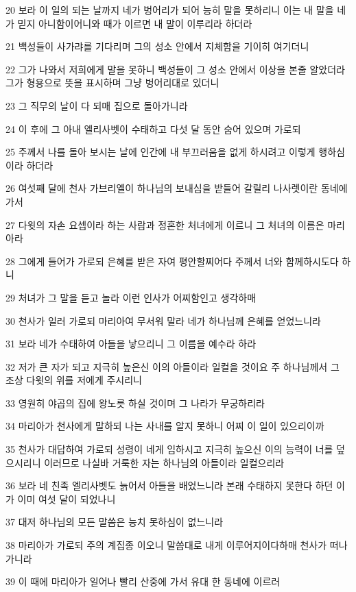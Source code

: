 \par 20 보라 이 일의 되는 날까지 네가 벙어리가 되어 능히 말을 못하리니 이는 내 말을 네가 믿지 아니함이어니와 때가 이르면 내 말이 이루리라 하더라
\par 21 백성들이 사가랴를 기다리며 그의 성소 안에서 지체함을 기이히 여기더니
\par 22 그가 나와서 저희에게 말을 못하니 백성들이 그 성소 안에서 이상을 본줄 알았더라 그가 형용으로 뜻을 표시하며 그냥 벙어리대로 있더니
\par 23 그 직무의 날이 다 되매 집으로 돌아가니라
\par 24 이 후에 그 아내 엘리사벳이 수태하고 다섯 달 동안 숨어 있으며 가로되
\par 25 주께서 나를 돌아 보시는 날에 인간에 내 부끄러움을 없게 하시려고 이렇게 행하심이라 하더라
\par 26 여섯째 달에 천사 가브리엘이 하나님의 보내심을 받들어 갈릴리 나사렛이란 동네에 가서
\par 27 다윗의 자손 요셉이라 하는 사람과 정혼한 처녀에게 이르니 그 처녀의 이름은 마리아라
\par 28 그에게 들어가 가로되 은혜를 받은 자여 평안할찌어다 주께서 너와 함께하시도다 하니
\par 29 처녀가 그 말을 듣고 놀라 이런 인사가 어찌함인고 생각하매
\par 30 천사가 일러 가로되 마리아여 무서워 말라 네가 하나님께 은혜를 얻었느니라
\par 31 보라 네가 수태하여 아들을 낳으리니 그 이름을 예수라 하라
\par 32 저가 큰 자가 되고 지극히 높은신 이의 아들이라 일컬을 것이요 주 하나님께서 그 조상 다윗의 위를 저에게 주시리니
\par 33 영원히 야곱의 집에 왕노릇 하실 것이며 그 나라가 무궁하리라
\par 34 마리아가 천사에게 말하되 나는 사내를 알지 못하니 어찌 이 일이 있으리이까
\par 35 천사가 대답하여 가로되 성령이 네게 임하시고 지극히 높으신 이의 능력이 너를 덮으시리니 이러므로 나실바 거룩한 자는 하나님의 아들이라 일컬으리라
\par 36 보라 네 친족 엘리사벳도 늙어서 아들을 배었느니라 본래 수태하지 못한다 하던 이가 이미 여섯 달이 되었나니
\par 37 대저 하나님의 모든 말씀은 능치 못하심이 없느니라
\par 38 마리아가 가로되 주의 계집종 이오니 말씀대로 내게 이루어지이다하매 천사가 떠나가니라
\par 39 이 때에 마리아가 일어나 빨리 산중에 가서 유대 한 동네에 이르러
